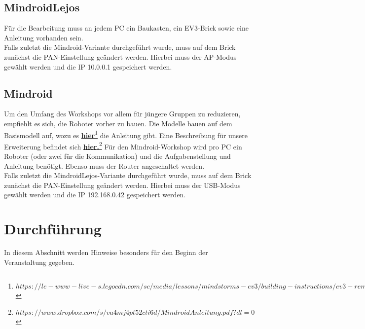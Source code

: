 \documentclass[
	ngerman,
	IMRAD=false,
	DIV=calc,
	paper=a4,
	marginpar=false,
	accentcolor=1c,%
	]{tudapub}
\begin{document}
\subsection{MindroidLejos}
F\"ur die Bearbeitung muss an jedem PC ein Baukasten, ein EV3-Brick sowie eine Anleitung vorhanden sein.\\
Falls zuletzt die Mindroid-Variante durchgef\"uhrt wurde, muss auf dem Brick zun\"achst die PAN-Einstellung ge\"andert werden. Hierbei muss der AP-Modus gew\"ahlt werden und die IP 10.0.0.1 gespeichert werden.

\subsection{Mindroid}
Um den Umfang des Workshops vor allem f\"ur j\"ungere Gruppen zu reduzieren, empfiehlt es sich, die Roboter vorher zu bauen. Die Modelle bauen auf dem Basismodell auf, wozu es \href{https://le-www-live-s.legocdn.com/sc/media/lessons/mindstorms-ev3/building-instructions/ev3-rem-driving-base-79bebfc16bd491186ea9c9069842155e.pdf}{\textbf{hier}\footnote{$https://le-www-live-s.legocdn.com/sc/media/lessons/mindstorms-ev3/building-instructions/ev3-rem-driving-base-79bebfc16bd491186ea9c9069842155e.pdf$}} die Anleitung gibt.
Eine Beschreibung f\"ur unsere Erweiterung befindet sich 
\href{https://www.dropbox.com/s/va4mj4pt52cti6d/MindroidAnleitung.pdf?dl=0}{\textbf{hier.}\footnote{$https://www.dropbox.com/s/va4mj4pt52cti6d/MindroidAnleitung.pdf?dl=0$}}\newline
F\"ur den Mindroid-Workshop wird pro PC ein Roboter (oder zwei f\"ur die Kommunikation) und die Aufgabenstellung und Anleitung ben\"otigt. Ebenso muss der Router angeschaltet werden.\\
Falls zuletzt die MindroidLejos-Variante durchgef\"uhrt wurde, muss auf dem Brick zun\"achst die PAN-Einstellung ge\"andert werden. Hierbei muss der USB-Modus gew\"ahlt werden und die IP 192.168.0.42 gespeichert werden.

\section{Durchf\"uhrung}
In diesem Abschnitt werden Hinweise besonders f\"ur den Beginn der Veranstaltung gegeben.
\end{document}
